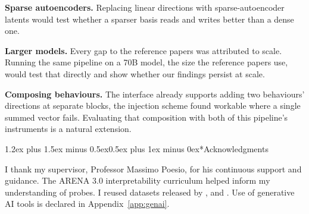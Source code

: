 \documentclass[conference]{IEEEtran}
\makeatletter
\renewcommand{\section}{\@startsection{section}{1}{\z@}%
  {1.2ex plus 1.5ex minus 0.5ex}{0.5ex plus 1ex minus 0ex}{\normalfont\normalsize\centering\scshape}}
\makeatother
\begin{document}
\textbf{Sparse autoencoders.} Replacing linear directions with
sparse-autoencoder latents \citep{cunningham2023,bricken2023} would test
whether a sparser basis reads and writes better than a dense one.

\textbf{Larger models.} Every gap to the reference papers was attributed
to scale. Running the same pipeline on a 70B model, the size the reference papers
use, would test that directly and show whether our findings persist
at scale.

\textbf{Composing behaviours.} The interface already supports adding two behaviours'
directions at separate blocks, the injection scheme \citet{vanderweij2024}
found workable where a single summed vector fails. Evaluating that
composition with both of this pipeline's instruments is a natural
extension.

\section*{Acknowledgments}

I thank my supervisor, Professor Massimo Poesio, for his continuous support and guidance. The ARENA 3.0 interpretability curriculum \citep{arena2024} helped inform my understanding of probes. I reused datasets
released by \citet{goldowsky2025}, \citet{mckenzie2025} and \citet{cincynlp2025}.
Use of generative AI tools is declared in Appendix~\ref{app:genai}.
\end{document}
